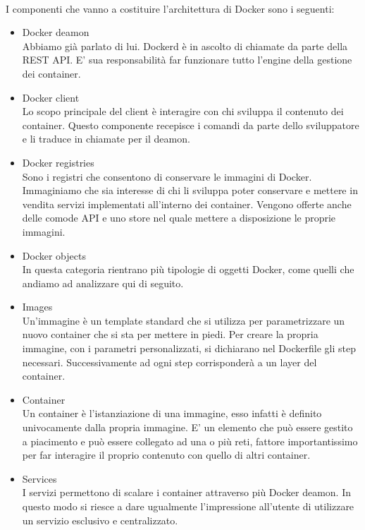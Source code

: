 \paragraph{}
I componenti che vanno a costituire l'architettura di Docker sono i seguenti:
\begin{itemize}
	\item Docker deamon \\
	Abbiamo già parlato di lui. Dockerd è in ascolto di chiamate da parte della REST API. E' sua responsabilità far funzionare tutto l'engine della gestione dei container.
	\item Docker client \\
	Lo scopo principale del client è interagire con chi sviluppa il contenuto dei container. Questo componente recepisce i comandi da parte dello sviluppatore e li traduce in chiamate per il deamon.
	\item Docker registries \\
	Sono i registri che consentono di conservare le immagini di Docker. Immaginiamo che sia interesse di chi li sviluppa poter conservare e mettere in vendita servizi implementati all'interno dei container. Vengono offerte anche delle comode API e uno store nel quale mettere a disposizione le proprie immagini.
	\item  Docker objects \\
	In questa categoria rientrano più tipologie di oggetti Docker, come quelli che andiamo ad analizzare qui di seguito.
	\item  Images \\
	Un'immagine è un template standard che si utilizza per parametrizzare un nuovo container che si sta per mettere in piedi. Per creare la propria immagine, con i parametri personalizzati, si dichiarano nel Dockerfile gli step necessari. Successivamente ad ogni step corrisponderà a un layer del container.
	\item  Container \\
	Un container è l'istanziazione di una immagine, esso infatti è definito univocamente dalla propria immagine. E' un elemento che può essere gestito a piacimento e può essere collegato ad una o più reti, fattore importantissimo per far interagire il proprio contenuto con quello di altri container.
	\item Services \\
	I servizi permettono di scalare i container attraverso più Docker deamon. In questo modo si riesce a dare ugualmente l'impressione all'utente di utilizzare un servizio esclusivo e centralizzato.
\end{itemize}

